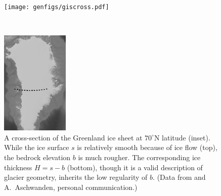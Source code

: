 \documentclass[hidelinks,onefignum,onetabnum,final]{siamart220329}  %
\begin{document}
\begin{figure}
\begin{minipage}[t]{0.85\textwidth}
\vspace{0pt}
\texttt{[image: genfigs/giscross.pdf]}
\end{minipage}
\,
\begin{minipage}[t]{0.13\textwidth}
\vspace{10pt}
\includegraphics[width=\textwidth]{genfigs/gis/gris-profile-gray.png}
\end{minipage}
\caption{A cross-section of the Greenland ice sheet at $70^\circ$N latitude (inset).  While the ice surface $s$ is relatively smooth because of ice flow (top), the bedrock elevation $b$ is much rougher.  The corresponding ice thickness $H = s-b$ (bottom), though it is a valid description of glacier geometry, inherits the low regularity of $b$.  (Data from \cite{Morlighemetal2017} and A.~Aschwanden, personal communication.)}
\label{fig:giscross}
\end{figure}
\end{document}
